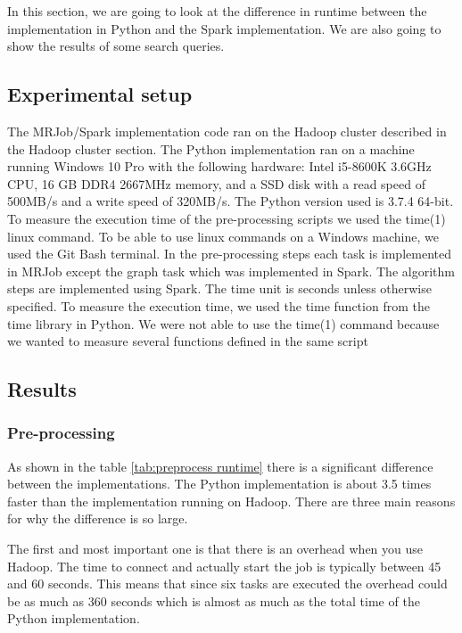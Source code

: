 In this section, we are going to look at the difference in runtime between the implementation in Python and the Spark implementation. We are also going to show the results of some search queries.

\subsection{Experimental setup}

The MRJob/Spark implementation code ran on the Hadoop cluster described in the Hadoop cluster section. The Python implementation ran on a machine running Windows 10 Pro with the following hardware: Intel i5-8600K 3.6GHz CPU, 16 GB DDR4 2667MHz memory, and a SSD disk with a read speed of 500MB/s and a write speed of 320MB/s. The Python version used is 3.7.4 64-bit. To measure the execution time of the pre-processing scripts we used the time(1)\cite{Time1} linux command. To be able to use linux commands on a Windows machine, we used the Git Bash terminal\cite{GitBash}. In the pre-processing steps each task is implemented in MRJob except the graph task which was implemented in Spark. The algorithm steps are implemented using Spark. The time unit is seconds unless otherwise specified. To measure the execution time, we used the time function from the time library in Python. We were not able to use the time(1) command because we wanted to measure several functions defined in the same script

\subsection{Results}

\subsubsection{Pre-processing}

As shown in the table \ref{tab:preprocess runtime} there is a significant difference between the implementations. The Python implementation is about 3.5 times faster than the implementation running on Hadoop. There are three main reasons for why the difference is so large.
 
The first and most important one is that there is an overhead when you use Hadoop. The time to connect and actually start the job is typically between 45 and 60 seconds. This means that since six tasks are executed the overhead could be as much as 360 seconds which is almost as much as the total time of the Python implementation. 

